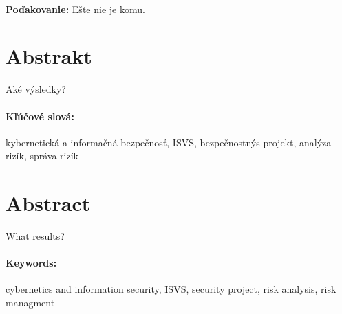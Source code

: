 \documentclass[12pt, twoside]{book}
\begin{document}
\newpage 
\pagestyle{plain}
~

\vfill
{\bf Poďakovanie:} Ešte nie je komu.


\newpage 
\section*{Abstrakt}

Aké výsledky?

\paragraph*{Kľúčové slová:} 
kybernetická a informačná bezpečnosť,
ISVS,
bezpečnostnýs projekt,
analýza rizík,
správa rizík


\newpage 
\section*{Abstract}

What results?

\paragraph*{Keywords:} 
cybernetics and information security,
ISVS,
security project,
risk analysis,
risk managment




\cleardoublepage
\tableofcontents



\newpage 

\listoffigures
\listoftables


\mainmatter
\pagestyle{headings}








% 



\newpage	

\backmatter

\thispagestyle{empty}
\clearpage


 



%
\end{document}
